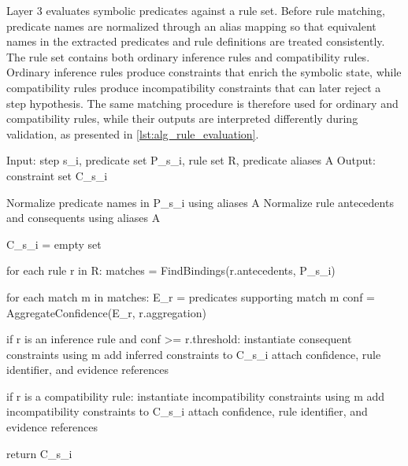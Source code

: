 Layer 3 evaluates symbolic predicates against a rule set. Before rule matching, predicate names are normalized through an alias mapping so that equivalent names in the extracted predicates and rule definitions are treated consistently. The rule set contains both ordinary inference rules and compatibility rules. Ordinary inference rules produce constraints that enrich the symbolic state, while compatibility rules produce incompatibility constraints that can later reject a step hypothesis. The same matching procedure is therefore used for ordinary and compatibility rules, while their outputs are interpreted differently during validation, as presented in \cref{lst:alg_rule_evaluation}.



{\color{red}
\begin{listing*}
\begin{Code}
Input: step s_i, predicate set P_{s_i}, rule set R, predicate aliases A
Output: constraint set C_{s_i}

Normalize predicate names in P_{s_i} using aliases A
Normalize rule antecedents and consequents using aliases A

C_{s_i} = empty set

for each rule r in R:
    matches = FindBindings(r.antecedents, P_{s_i})

    for each match m in matches:
        E_r = predicates supporting match m
        conf = AggregateConfidence(E_r, r.aggregation)

        if r is an inference rule and conf >= r.threshold:
            instantiate consequent constraints using m
            add inferred constraints to C_{s_i}
            attach confidence, rule identifier, and evidence references

        if r is a compatibility rule:
            instantiate incompatibility constraints using m
            add incompatibility constraints to C_{s_i}
            attach confidence, rule identifier, and evidence references

return C_{s_i}
\end{Code}
\caption{Algorithm for rule evaluation in Layer 3. Predicate aliases are used to normalize equivalent predicate names before rule matching. Inference rules produce ordinary constraints, while compatibility rules produce incompatibility constraints used during validation.}
\label{lst:alg_rule_evaluation}
\end{listing*}
}



